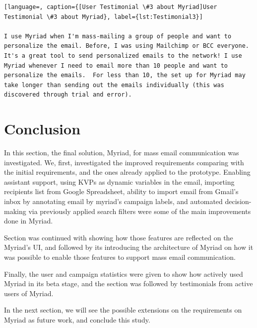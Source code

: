 \vspace{1cm}

\begin{lstlisting}[language=, caption={[User Testimonial \#3 about Myriad]User Testimonial \#3 about Myriad}, label={lst:Testimonial3}]

I use Myriad when I'm mass-mailing a group of people and want to personalize the email. Before, I was using Mailchimp or BCC everyone. It's a great tool to send personalized emails to the network! I use Myriad whenever I need to email more than 10 people and want to personalize the emails.  For less than 10, the set up for Myriad may take longer than sending out the emails individually (this was discovered through trial and error).
\end{lstlisting}

\section{Conclusion}
\label{sec:5.5:Conc}

In this section, the final solution, Myriad, for mass email communication was investigated. We, first, investigated the improved requirements comparing with the initial requirements, and the ones already applied to the prototype. Enabling assistant support, using \ac{KVP}s as dynamic variables in the email, importing recipients list from Google Spreadsheet, ability to import email from Gmail's inbox by annotating email by myriad's campaign labels, and automated decision-making via previously applied search filters were some of the main improvements done in Myriad.
\vspace{1cm}

Section was continued with showing how those features are reflected on the Myriad's \ac{UI}, and followed by its introducing the architecture of Myriad on how it was possible to enable those features to support mass email communication.
\vspace{1cm}

Finally, the user and campaign statistics were given to show how actively used Myriad in its beta stage, and the section was followed by testimonials from active users of Myriad.
\vspace{1cm}

In the next section, we will see the possible extensions on the requirements on Myriad as future work, and conclude this study.

